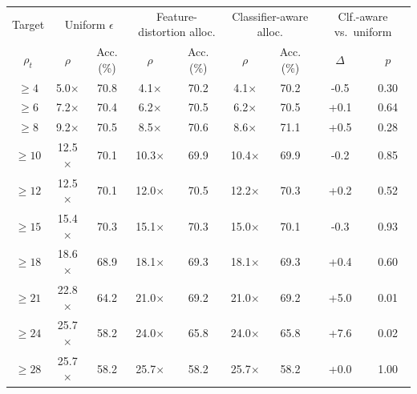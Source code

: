 \begin{tabular}{ccccccccc}
\toprule
Target & \multicolumn{2}{c}{Uniform $\epsilon$} & \multicolumn{2}{c}{Feature-distortion alloc.} & \multicolumn{2}{c}{Classifier-aware alloc.} & \multicolumn{2}{c}{Clf.-aware vs.\ uniform} \\
$\rho_t$ & $\rho$ & Acc. (\%) & $\rho$ & Acc. (\%) & $\rho$ & Acc. (\%) & $\Delta$ & $p$ \\
\midrule
$\ge4$ & 5.0$\times$ & 70.8 & 4.1$\times$ & 70.2 & 4.1$\times$ & 70.2 & -0.5 & 0.30 \\
$\ge6$ & 7.2$\times$ & 70.4 & 6.2$\times$ & 70.5 & 6.2$\times$ & 70.5 & +0.1 & 0.64 \\
$\ge8$ & 9.2$\times$ & 70.5 & 8.5$\times$ & 70.6 & 8.6$\times$ & 71.1 & +0.5 & 0.28 \\
$\ge10$ & 12.5$\times$ & 70.1 & 10.3$\times$ & 69.9 & 10.4$\times$ & 69.9 & -0.2 & 0.85 \\
$\ge12$ & 12.5$\times$ & 70.1 & 12.0$\times$ & 70.5 & 12.2$\times$ & 70.3 & +0.2 & 0.52 \\
$\ge15$ & 15.4$\times$ & 70.3 & 15.1$\times$ & 70.3 & 15.0$\times$ & 70.1 & -0.3 & 0.93 \\
$\ge18$ & 18.6$\times$ & 68.9 & 18.1$\times$ & 69.3 & 18.1$\times$ & 69.3 & +0.4 & 0.60 \\
$\ge21$ & 22.8$\times$ & 64.2 & 21.0$\times$ & 69.2 & 21.0$\times$ & 69.2 & +5.0 & 0.01 \\
$\ge24$ & 25.7$\times$ & 58.2 & 24.0$\times$ & 65.8 & 24.0$\times$ & 65.8 & +7.6 & 0.02 \\
$\ge28$ & 25.7$\times$ & 58.2 & 25.7$\times$ & 58.2 & 25.7$\times$ & 58.2 & +0.0 & 1.00 \\
\bottomrule
\end{tabular}
